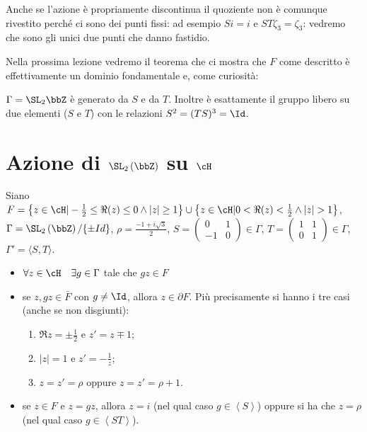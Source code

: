 Anche se l'azione è propriamente discontinua il quoziente non è comunque
rivestito perché ci sono dei punti fissi: ad esempio $Si = i$ e $ST
\zeta_3 = \zeta_3$: vedremo che sono gli unici due punti che danno fastidio.


Nella prossima lezione vedremo il teorema che ci mostra che $F$ come
descritto è effettivamente un dominio fondamentale e, come curiosità:
\begin{teorema}
  $\Gamma = \SL_2 \bbZ$ è generato da $S$ e da $T$. Inoltre è esattamente il
  gruppo libero su due elementi ($S$ e $T$) con le relazioni
  $S^2 = (TS)^3 = \Id$.
\end{teorema}


\section{Azione di $\SL_2 \left( \bbZ \right)$ su $\cH$}

Siano $F=\left\{z \in \cH | -\frac{1}{2} \leq \Re(z) \leq 0
\wedge |z| \geq 1 \right\} \cup
\left\{z \in \cH | 0 < \Re(z) < \frac{1}{2} \wedge |z| > 1 \right\}$,
$\Gamma = \SL_2 \left( \bbZ \right)/\{\pm Id\}$,   $\rho=\frac{-1+i\sqrt{3}}{2}$,
$S=\left( \begin{array}{cc} 0 & 1 \\ -1 & 0 \end{array} \right) \in \Gamma$,
$T=\left( \begin{array}{cc} 1 & 1 \\ 0 & 1 \end{array} \right) \in \Gamma$,
$\Gamma' = \langle S, T \rangle$.

\begin{teorema}
\begin{itemize}
\item[P0] $\forall z \in \cH \quad \exists g \in \Gamma$ tale che $gz \in F$
\item[P1] se $z,gz \in \bar{F}$ con $g \neq \Id$, allora $z \in \partial F$.
  Più precisamente si hanno i tre casi (anche se non disgiunti):
  \begin{enumerate}
  \item[C1] $\Re z = \pm \frac{1}{2}$ e $z' = z \mp 1$;
  \item[C2] $|z| = 1$ e $z' = - \frac{1}{z}$;
  \item[C3] $z = z' = \rho$ oppure $z = z' = \rho + 1$.
  \end{enumerate}
\item[P2] se $z \in F$ e $z=gz$,
  allora $z=i$ (nel qual caso $g \in \left\langle S \right\rangle$) oppure si ha che
  $z= \rho$ (nel qual caso $g \in \left\langle ST \right\rangle$).
\end{itemize}
\end{teorema}

